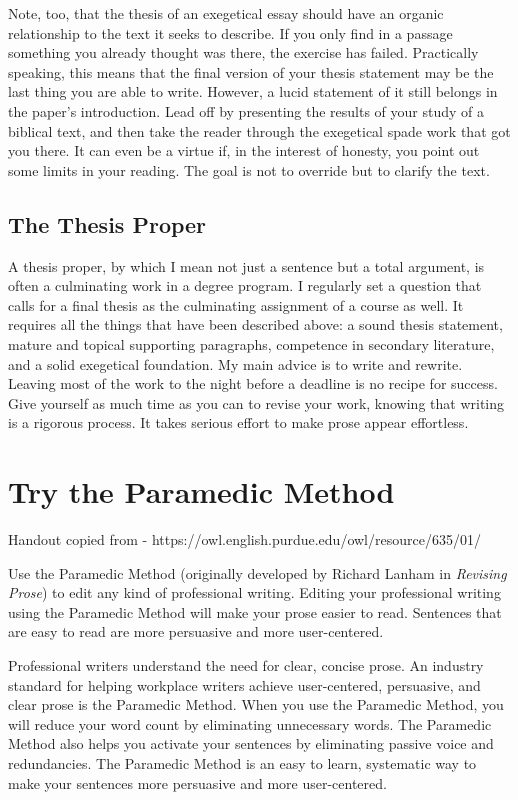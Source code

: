 \documentclass[11pt]{article}
\begin{document}
Note, too, that the thesis of an exegetical essay should have an organic
relationship to the text it seeks to describe. If you only find in a
passage something you already thought was there, the exercise has
failed. Practically speaking, this means that the final version of your
thesis statement may be the last thing you are able to write. However, a
lucid statement of it still belongs in the paper's introduction. Lead
off by presenting the results of your study of a biblical text, and then
take the reader through the exegetical spade work that got you there. It
can even be a virtue if, in the interest of honesty, you point out some
limits in your reading. The goal is not to override but to clarify the
text.

\subsection{The Thesis Proper}

A thesis proper, by which I mean not just a sentence but a total
argument, is often a culminating work in a degree program. I regularly
set a question that calls for a final thesis as the culminating
assignment of a course as well. It requires all the things that have
been described above: a sound thesis statement, mature and topical
supporting paragraphs, competence in secondary literature, and a solid
exegetical foundation. My main advice is to write and rewrite. Leaving
most of the work to the night before a deadline is no recipe for
success. Give yourself as much time as you can to revise your work,
knowing that writing is a rigorous process. It takes serious effort to
make prose appear effortless.

\section{Try the Paramedic Method}

Handout copied from - https://owl.english.purdue.edu/owl/resource/635/01/

Use the Paramedic Method (originally developed by Richard Lanham in
\emph{Revising Prose}) to edit any kind of professional writing. Editing
your professional writing using the Paramedic Method will make your
prose easier to read. Sentences that are easy to read are more
persuasive and more user-centered.

Professional writers understand the need for clear, concise prose. An
industry standard for helping workplace writers achieve user-centered,
persuasive, and clear prose is the Paramedic Method. When you use the
Paramedic Method, you will reduce your word count by eliminating
unnecessary words. The Paramedic Method also helps you activate your
sentences by eliminating passive voice and redundancies. The Paramedic
Method is an easy to learn, systematic way to make your sentences more
persuasive and more user-centered.
\end{document}
